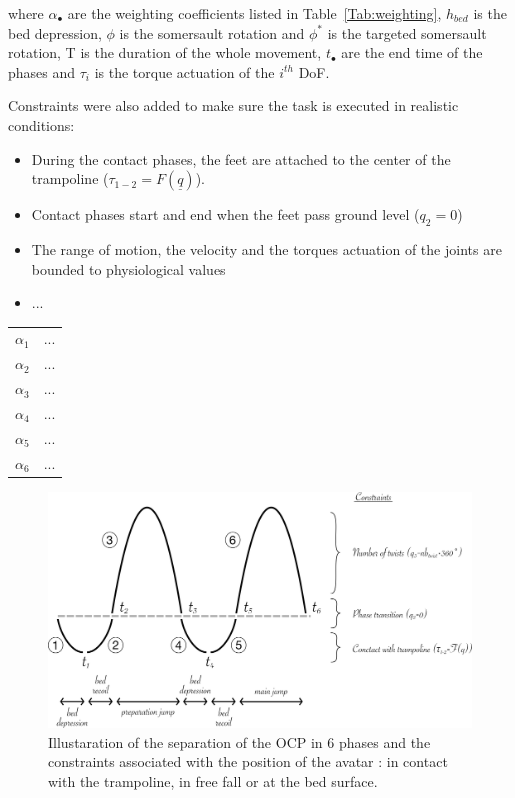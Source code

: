 \noindent where $\alpha_\bullet$ are the weighting coefficients listed in Table~\ref{Tab:weighting}, $h_{bed}$ is the bed depression, $\phi$ is the somersault rotation and $\phi^*$ is the targeted somersault rotation, T is the duration of the whole movement, $t_{\bullet}$ are the end time of the phases and $\tau_i$ is the torque actuation of the $i^{th}$ DoF.


Constraints were also added to make sure the task is executed in realistic conditions: 
\begin{itemize}
\item During the contact phases, the feet are attached to the center of the trampoline ($\tau_{1-2} = F(\underline{q})$).
\item Contact phases start and end when the feet pass ground level ($q_2 = 0$)
\item The range of motion, the velocity and the torques actuation of the joints are bounded to physiological values
\item ...
\end{itemize}


\begin{center}
\begin{tabular}{ c c }
 $\alpha_1$ & ... \\ 
 $\alpha_2$ & ... \\ 
 $\alpha_3$ & ... \\ 
 $\alpha_4$ & ... \\ 
 $\alpha_5$ & ... \\ 
 $\alpha_6$ & ...
\end{tabular}
\label{Tab:weighting}
\end{center}


\begin{figure}[h!]
\centering
\includegraphics[width=\linewidth]{figures/Model_phases.png}
\caption{Illustaration of the separation of the OCP in 6 phases and the constraints associated with the position of the avatar : in contact with the trampoline, in free fall or at the bed surface.}
\label{fig:Model_phases}
\end{figure}


